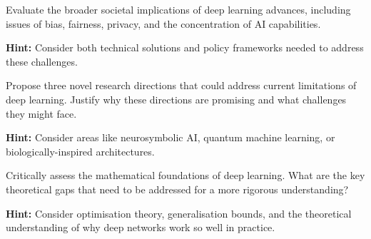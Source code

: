 \begin{problem}
Evaluate the broader societal implications of deep learning advances, including issues of bias, fairness, privacy, and the concentration of AI capabilities.

\textbf{Hint:} Consider both technical solutions and policy frameworks needed to address these challenges.
\end{problem}

\begin{problem}
Propose three novel research directions that could address current limitations of deep learning. Justify why these directions are promising and what challenges they might face.

\textbf{Hint:} Consider areas like neurosymbolic AI, quantum machine learning, or biologically-inspired architectures.
\end{problem}

\begin{problem}
Critically assess the mathematical foundations of deep learning. What are the key theoretical gaps that need to be addressed for a more rigorous understanding?

\textbf{Hint:} Consider optimisation theory, generalisation bounds, and the theoretical understanding of why deep networks work so well in practice.
\end{problem}

